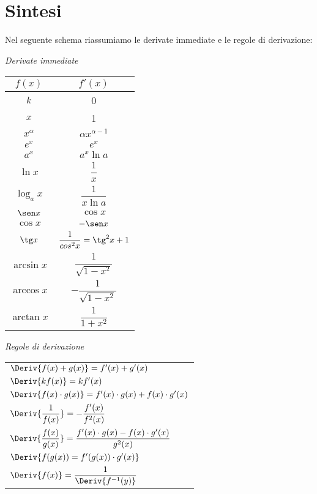 \section{Sintesi}
\label{subsec:diff01_derisintesi}
Nel seguente schema riassumiamo le derivate immediate e le regole di 
derivazione:

\vspace{1em}
\begin{minipage}[c]{.48\textwidth}
\begin{center}
\emph{Derivate immediate}

\vspace{.5em}
\begin{tabular}{cc} 
\toprule
\(f(x)\) & \(f'(x)\)\\ 
\midrule 
\(k\)  & 0 \\ [6pt]
\(x\) & 1 \\ [6pt]
\(x^\alpha\) & \(\alpha x^{\alpha-1}\) \\ [6pt]
\(e^x\) & \(e^x\)\\ [6pt]
\(a^x\) & \(a^x\ln a\)\\[6pt]
\(\ln x\) & \(\dfrac{1}{x}\)\\[6pt]
\(\log_a x\) & \(\dfrac{1}{x\ln a}\)\\[6pt]
\(\sen x\) & \(\cos x\) \\ [6pt]
\(\cos x\) & \(-\sen x\) \\ [6pt]
\(\tg x\) & \(\dfrac{1}{cos^2 x}=\tg^2 x +1\) \\[6pt]
\(\arcsin x\) & \(\dfrac{1}{\sqrt{1 -x^2}}\)\\[6pt]
\(\arccos x\) & \(-\dfrac{1}{\sqrt{1 -x^2}}\)\\[6pt]
\(\arctan x\) & \(\dfrac{1}{1 +x^2}\)\\
\bottomrule
\end{tabular}
\end{center}
\end{minipage}
\hfill
\begin{minipage}[c]{.48\textwidth}
\begin{center}
\emph{Regole di derivazione}

\vspace{.5em}
\begin{tabular}{l}
\toprule
\(\Deriv{f(x)+g(x)} = f'(x)+g'(x)\)\\[8pt]
\(\Deriv{kf(x)} = kf'(x)\)\\[8pt]
\(\Deriv{f(x)\cdot g(x)} = f'(x)\cdot g(x)+f(x)\cdot g'(x)\)\\[8pt]
\(\Deriv{\dfrac{1}{f(x)}} = -\dfrac{f'(x)}{f^2(x)}\)\\[8pt]
\(\Deriv{\dfrac{f(x)}{g(x)}} = \dfrac{f'(x)\cdot g(x)-f(x)
                               \cdot g'(x)}{g^2(x)}\)\\[8pt]
\(\Deriv{f(g(x)) = f'(g(x))\cdot g'(x)}\) \\[8pt]
\(\Deriv{f(x)} = \dfrac{1}{\Deriv{f^{-1}(y)}}\)\\
\bottomrule
\end{tabular}
\end{center}
\end{minipage}



